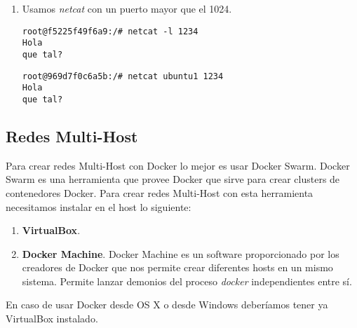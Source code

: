 \begin{enumerate}
\begin{enumerate}
					\item Usamos \textit{netcat} con un puerto mayor que el 1024.
					\begin{lstlisting}[style=consola]
root@f5225f49f6a9:/# netcat -l 1234
Hola
que tal?
					\end{lstlisting}
					\begin{lstlisting}[style=consola]
root@969d7f0c6a5b:/# netcat ubuntu1 1234
Hola
que tal?
					\end{lstlisting}
				\end{enumerate}
			\end{enumerate}
			
		\subsection{Redes Multi-Host}
		Para crear redes Multi-Host con Docker lo mejor es usar Docker Swarm. Docker Swarm es una herramienta que provee Docker que sirve para crear clusters de contenedores Docker. Para crear redes Multi-Host con esta herramienta necesitamos instalar en el host lo siguiente:
		
		\begin{enumerate}
			\item \textbf{VirtualBox}.
			\item \textbf{Docker Machine}. Docker Machine es un software proporcionado por los creadores de Docker que nos permite crear diferentes hosts en un mismo sistema. \cite{docker-machine} Permite lanzar demonios del proceso \textit{docker} independientes entre sí.
		\end{enumerate}
		
		En caso de usar Docker desde OS X o desde Windows deberíamos tener ya VirtualBox instalado.
		
